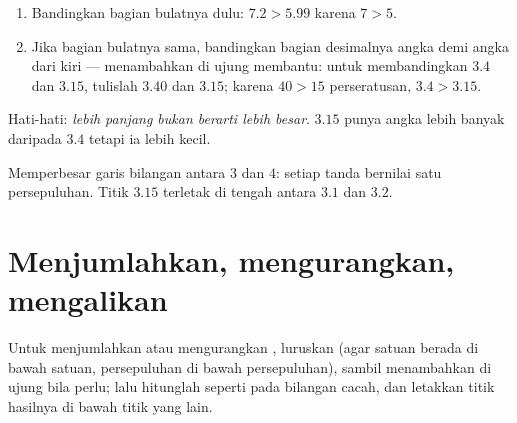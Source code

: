 \begin{method}\label{met:g6:decimals:compare}
\begin{enumerate}
  \item Bandingkan bagian bulatnya dulu: $7.2 > 5.99$ karena $7 > 5$.
  \item Jika bagian bulatnya sama, bandingkan bagian desimalnya angka
        demi angka dari kiri --- menambahkan  di ujung membantu:
        untuk membandingkan $3.4$ dan $3.15$, tulislah $3.40$ dan
        $3.15$; karena $40 > 15$ perseratusan, $3.4 > 3.15$.
\end{enumerate}
Hati-hati: \emph{lebih panjang bukan berarti lebih besar}. $3.15$
punya angka lebih banyak daripada $3.4$ tetapi ia lebih kecil.
\end{method}

\begin{omfigure}

{\small Memperbesar garis bilangan antara $3$ dan $4$: setiap tanda
bernilai satu persepuluhan. Titik $3.15$ terletak di tengah antara $3.1$ dan $3.2$.}
\end{omfigure}

\section{Menjumlahkan, mengurangkan, mengalikan}

\begin{method}\label{met:g6:decimals:columns}
Untuk menjumlahkan atau mengurangkan , luruskan
\emph{} (agar satuan berada di bawah satuan,
persepuluhan di bawah persepuluhan), sambil menambahkan  di ujung
bila perlu; lalu hitunglah seperti pada bilangan cacah, dan letakkan
titik hasilnya di bawah titik yang lain.
\end{method}

